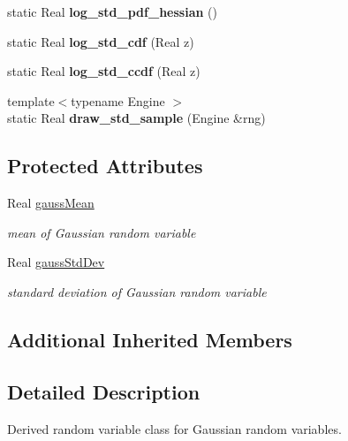 \begin{DoxyCompactItemize}
\item 
static Real {\bfseries log\+\_\+std\+\_\+pdf\+\_\+hessian} ()\label{classPecos_1_1NormalRandomVariable_ae4d8f47aa3f234d3887059246d213335}

\item 
static Real {\bfseries log\+\_\+std\+\_\+cdf} (Real z)\label{classPecos_1_1NormalRandomVariable_ad7af5d4f067abfbda2fc15a24c992206}

\item 
static Real {\bfseries log\+\_\+std\+\_\+ccdf} (Real z)\label{classPecos_1_1NormalRandomVariable_aebae2e3981abbab367a1ecd8a4755868}

\item 
{\footnotesize template$<$typename Engine $>$ }\\static Real {\bfseries draw\+\_\+std\+\_\+sample} (Engine \&rng)\label{classPecos_1_1NormalRandomVariable_a6fcc236683df40e8eb64ea81b5e38de9}

\end{DoxyCompactItemize}
\subsection*{Protected Attributes}
\begin{DoxyCompactItemize}
\item 
Real \hyperlink{classPecos_1_1NormalRandomVariable_ac9a37579d73aacb9cbab27e3be731e64}{gauss\+Mean}\label{classPecos_1_1NormalRandomVariable_ac9a37579d73aacb9cbab27e3be731e64}

\begin{DoxyCompactList}\small\item\em mean of Gaussian random variable \end{DoxyCompactList}\item 
Real \hyperlink{classPecos_1_1NormalRandomVariable_aab6c8417eeb34557962638736c554927}{gauss\+Std\+Dev}\label{classPecos_1_1NormalRandomVariable_aab6c8417eeb34557962638736c554927}

\begin{DoxyCompactList}\small\item\em standard deviation of Gaussian random variable \end{DoxyCompactList}\end{DoxyCompactItemize}
\subsection*{Additional Inherited Members}


\subsection{Detailed Description}
Derived random variable class for Gaussian random variables. 

